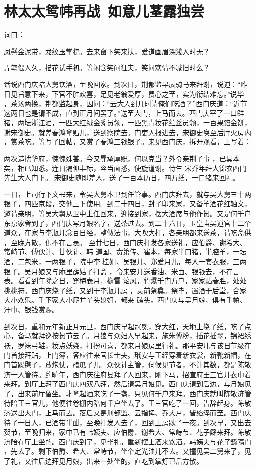 \chapter{林太太鸳帏再战~如意儿茎露独尝}

词曰：

凤髻金泥带，龙纹玉掌梳。去来窗下笑来扶，爱道画眉深浅入时无？

弄笔偎人久，描花试手初。等闲含笑问狂夫，笑问欢情不减旧时么？

话说西门庆陪大舅饮酒，至晚回家。到次日，荆都监早辰骑马来拜谢，说道：“昨
日见旨意下来，下官不胜欢喜，足见老翁爱厚，费心之至，实为衔结难忘。”说毕
，茶汤两换，荆都监起身，因问：“云大人到几时请俺们吃酒？”西门庆道：“近节
这两日也是请不成，直到正月间罢了。”送至大门，上马而去。西门庆宰了一口鲜
猪，两坛浙江酒，一匹大红绒金豸员领，一匹黑青妆花纻丝员领，一百果馅金饼，
谢宋御史。就差春鸿拿贴儿，送到察院去。门吏人报进去，宋御史唤至后厅火房内
，赏茶吃。等写了回帖，又赏了春鸿三钱银子。来见西门庆，拆开观看，上写着：

两次造扰华府，悚愧殊甚。今又辱承厚贶，何以克当？外令亲荆子事
，已具本矣，相已知悉。连日渴仰丰标，容当面悉。使旋谨谢。侍生
宋乔年拜大锦衣西门先生大人门下。
宋御史随即差人，送了一百本历日，四万纸，一口猪来回礼。

一日，上司行下文书来，令吴大舅本卫到任管事。西门庆拜去，就与吴大舅三十两
银子，四匹京段，交他上下使用。到二十四日，封了印来家，又备羊酒花红轴文，
邀请亲朋，等吴大舅从卫中上任回来，迎接到家，摆大酒席与他作贺。又是何千户
东京家眷到了，西门庆写月娘名字，送茶过去。到二十六日，玉皇庙吴道官十二个
道众，在家与李瓶儿念百日经，整做法事，大吹大打，各亲朋都来送茶，请吃斋供
，至晚方散，俱不在言表。
至廿七日，西门庆打发各家送礼，应伯爵、谢希大、常峙节、傅伙计、甘伙计、韩
道国、贲第传、崔本，每家半口猪，半腔羊，一坛酒，二包米，一两银子，院中李
桂姐、吴银儿、郑爱月儿，每人一套衣服，三两银子。吴月娘又与庵里薛姑子打斋
，令来安儿送香油、米面、银钱去，不在言表。看看到年除之日，穿梅表月，檐雪
滚风，竹爆千门万户，家家贴春胜，处处挑桃符。西门庆烧了纸，又到于李瓶儿房
，灵前祭奠。祭毕，置酒于后堂，合家大小欢乐。手下家人小厮并丫头媳妇，都来
磕头。西门庆与吴月娘，俱有手帕、汗巾、银钱赏赐。

到次日，重和元年新正月元旦，西门庆早起冠冕，穿大红，天地上烧了纸，吃了点
心，备马就拜巡按贺节去了。月娘与众妇人早起来，施朱傅粉，插花插翠，锦裙绣
袄，罗袜弓鞋，妆点妖娆，打扮可喜，都来月娘房里行礼。那平安儿与该日节级在
门首接拜贴，上门簿，答应往来官长士夫。玳安与王经穿着新衣裳，新靴新帽，在
门首踢毽子，放炮仗，磕瓜子儿。众伙计主管，伺候见节者，不计其数，都是陈敬
济一人管待。约晌午，西门庆往府县拜了人回来，刚下马，招宣府王三官儿衣巾着
来拜。到厅上拜了西门庆四双八拜，然后请吴月娘见。西门庆请到后边，与月娘见
了，出来前厅留坐。才拿起酒来吃了一盏，只见何千户来拜。西门庆就叫陈敬济管
待陪王三官儿，他便往卷棚内陪何千户坐去了。王三官吃了一回，告辞起身。陈敬
济送出大门，上马而去。落后又是荆都监、云指挥、乔大户，皆络绎而至。西门庆
待了一日人，已酒带半酣，至晚打发人去了，回到上房歇了一夜。到次早，又出去
贺节，至晚归来，家中已有韩姨夫、应伯爵、谢希大、常峙节、花子繇来拜。陈敬
济陪在厅上坐的。西门庆到了，见毕礼，重新摆上酒来饮酒。韩姨夫与花子繇隔门
，先去了。剩下伯爵、希大、常峙节，坐个定光油儿不去。又撞见吴二舅来了，见
了礼，又往后边拜见月娘，出来一处坐的。直吃到掌灯已后方散。

